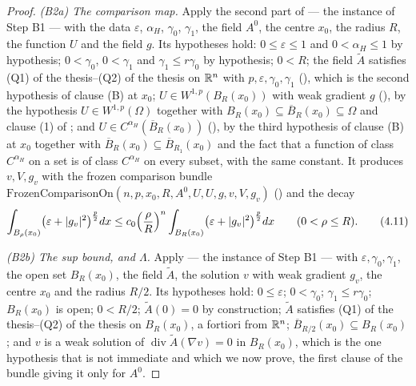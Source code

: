 \begin{proof}
\emph{(B2a) The comparison map.}  Apply the second part of
 --- the instance of Step B1 --- with the data
$\varepsilon$, $\alpha_H$, $\gamma_0$, $\gamma_1$, the field $A^0$, the centre
$x_0$, the radius $R$, the function $U$ and the field $g$.  Its hypotheses
hold: $0\le\varepsilon\le1$ and $0<\alpha_H\le1$ by hypothesis; $0<\gamma_0$,
$0<\gamma_1$ and $\gamma_1\le r\gamma_0$ by hypothesis; $0<R$; the field
$\widetilde A$ satisfies (Q1) of the thesis--(Q2) of the thesis on $\mathbb{R}^n$ with
$p,\varepsilon,\gamma_0,\gamma_1$ (), which is the
second hypothesis of clause (B) at $x_0$; $U\in W^{1,p}(B_R(x_0))$ with weak
gradient $g$ (), by the hypothesis
$U\in W^{1,p}(\Omega)$ together with $B_R(x_0)\subseteq\overline
B_R(x_0)\subseteq\Omega$ and clause (1) of ; and
$U\in C^{\alpha_H}(\overline B_R(x_0))$ (), by the third
hypothesis of clause (B) at $x_0$ together with
$\overline B_R(x_0)\subseteq\overline B_{R_1}(x_0)$ and the fact that a function
of class $C^{\alpha_H}$ on a set is of class $C^{\alpha_H}$ on every subset,
with the same constant.  It produces $v,V,g_v$ with the frozen comparison bundle
$\mathrm{FrozenComparisonOn}(n,p,x_0,R,A^0,U,U,g,v,V,g_v)$
() and the decay
\[
\int_{B_\rho(x_0)}\bigl(\varepsilon+|g_v|^2\bigr)^{\frac p2}dx
\le c_0\Bigl(\frac\rho R\Bigr)^{n}\int_{B_R(x_0)}\bigl(\varepsilon+|g_v|^2\bigr)^{\frac p2}dx
\qquad(0<\rho\le R).
\tag{4.11}
\]

\emph{(B2b) The sup bound, and $\Lambda$.}  Apply 
--- the instance of Step B1 --- with $\varepsilon,\gamma_0,\gamma_1$, the open
set $B_R(x_0)$, the field $\widetilde A$, the solution $v$ with weak gradient
$g_v$, the centre $x_0$ and the radius $R/2$.  Its hypotheses hold:
$0\le\varepsilon$; $0<\gamma_0$; $\gamma_1\le r\gamma_0$; $B_R(x_0)$ is open;
$0<R/2$; $\widetilde A(0)=0$ by construction; $\widetilde A$ satisfies
(Q1) of the thesis--(Q2) of the thesis on $B_R(x_0)$, a fortiori from $\mathbb{R}^n$;
$\overline B_{R/2}(x_0)\subseteq B_R(x_0)$; and $v$ is a weak solution of
$\operatorname{div}\widetilde A(\nabla v)=0$ in $B_R(x_0)$, which is the one
hypothesis that is not immediate and which we now prove, the first clause of the
bundle giving it only for $A^0$.


\end{proof}
